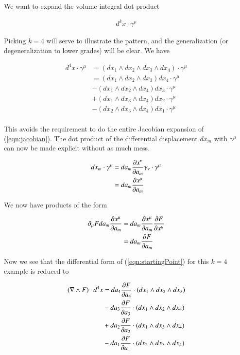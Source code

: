 We want to expand the volume integral dot product

\begin{align}
d^k x \cdot \gamma^\mu
\end{align}

Picking $k = 4$ will serve to illustrate the pattern, and the generalization (or degeneralization to lower grades) will be clear.  We have

\begin{align*}
d^4 x \cdot \gamma^\mu
&=
( dx_1 \wedge dx_2 \wedge dx_3 \wedge dx_4 ) \cdot \gamma^\mu \\
&= ( dx_1 \wedge dx_2 \wedge dx_3 ) dx_4 \cdot \gamma^\mu \\
&-( dx_1 \wedge dx_2 \wedge dx_4 ) dx_3 \cdot \gamma^\mu \\
&+( dx_1 \wedge dx_3 \wedge dx_4 ) dx_2 \cdot \gamma^\mu \\
&-( dx_2 \wedge dx_3 \wedge dx_4 ) dx_1 \cdot \gamma^\mu  \\
\end{align*}

This avoids the requirement to do the entire Jacobian expansion of (\ref{eqn:jacobian}).  The dot product of the differential displacement $dx_m$ with $\gamma^\mu$ can now be made explicit without as much mess.

\begin{align*}
dx_m \cdot \gamma^\mu 
&=
da_m \PD{a_m}{x^\nu} \gamma_\nu \cdot \gamma^\mu \\
&=
da_m \PD{a_m}{x^\mu} \\
\end{align*}

We now have products of the form

\begin{align*}
\partial_\mu F da_m \PD{a_m}{x^\mu} 
&=
da_m \PD{a_m}{x^\mu} \PD{x^\mu}{F} \\
&=
da_m \PD{a_m}{F} \\
\end{align*}

Now we see that the differential form of (\ref{eqn:startingPoint}) for this $k=4$ example is reduced to

\begin{align*}
( \grad \wedge F ) \cdot d^4 x 
&= da_4 \PD{a_4}{F} \cdot ( dx_1 \wedge dx_2 \wedge dx_3 ) \\
&- da_3 \PD{a_3}{F} \cdot ( dx_1 \wedge dx_2 \wedge dx_4 ) \\
&+ da_2 \PD{a_2}{F} \cdot ( dx_1 \wedge dx_3 \wedge dx_4 ) \\
&- da_1 \PD{a_1}{F} \cdot ( dx_2 \wedge dx_3 \wedge dx_4 ) \\
\end{align*}

